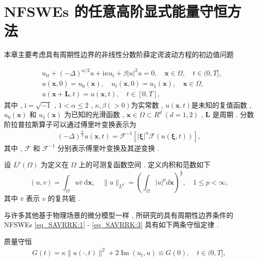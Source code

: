 \chapter[NFSWEs 的任意高阶显式能量守恒方法]{NFSWEs 的任意高阶显式能量守恒方法}

本章主要考虑具有周期性边界的非线性分数阶薛定谔波动方程的初边值问题

\begin{align}
&  u_{t t}+(-\Delta)^{\alpha / 2} u+\mathrm{i} \kappa u_{t}+\beta|u|^{2} u=0 , \quad \boldsymbol{x} \in \Omega , \quad  t \in(0 , T] , \label{eq_SAVRRK:1}\\
& u(\boldsymbol{x} , 0)=u_{0}(\boldsymbol{x}) , \quad u_{t}(\boldsymbol{x} , 0)=u_{1}(\boldsymbol{x}) , \quad \boldsymbol{x} \in \Omega , \label{eq_SAVRRK:2}\\
& u(\boldsymbol{x}+\boldsymbol{L} , t)=u(\boldsymbol{x} , t) , \quad t \in[0 , T] , \label{eq_SAVRRK:3}
\end{align}
其中 , $\mathrm{i}=\sqrt{-1}$ , $1<\alpha \leq 2$ , $\kappa , \beta(>0)$为实常数 , $u(\boldsymbol{x} , t)$是未知的复值函数 , $u_{0}(\boldsymbol{x})$ 和 $u_{1}(\boldsymbol{x})$ 为已知的光滑函数 , $\boldsymbol{x}\in\Omega\!\subset\!
R^d~(d\!=\!1 , 2)$ , $\boldsymbol{L}$ 是周期 . 分数阶拉普拉斯算子可以通过傅里叶变换表示为
\begin{align}\label{eq_SAVRRK:4}
(-\Delta)^{\frac{\alpha}{2}} u(\boldsymbol{x} , t)=\mathcal{F}^{-1}\left[|\boldsymbol{\xi}|^{\alpha} \mathcal{F}(u(\boldsymbol{\xi} , t))\right] , 
\end{align}
其中 , $\mathcal{F}$ 和 $\mathcal{F}^{-1}$ 分别表示傅里叶变换及其逆变换 \cite{caffarelliExtensionProblemRelated2007} . 

设 $L^{p}(\Omega)$ 为定义在 $\Omega$ 上的可测复函数空间 . 定义内积和范数如下
\begin{equation}
(u , v)=\int_{\Omega} u \bar{v} \mathrm{~d} \boldsymbol{x} , \quad \|u\|_{L^{p}}=\left(\int_{\Omega}|u|^{p} d \boldsymbol{x}\right)^{\frac{1}{p}} , \quad 1 \leq p<\infty , 
\label{eq_6}
\end{equation}
其中 $\bar{v}$ 表示 $v$ 的复共轭 . 

与许多其他基于物理场景的微分模型一样 , 所研究的具有周期性边界条件的NFSWEs \eqref{eq_SAVRRK:1} - \eqref{eq_SAVRRK:3}  具有如下两条守恒定律\cite{baoUniformErrorEstimates2012,ranLinearlyImplicitConservative2016} . 

质量守恒
\begin{align}\label{eq_PAVF:_8}
    G(t)=\kappa\|u(\cdot , t)\|^{2}+2\operatorname{Im}\left(u_{t} , u\right) \equiv G(0) , \quad t \in(0 , T] , 
    \end{align}

